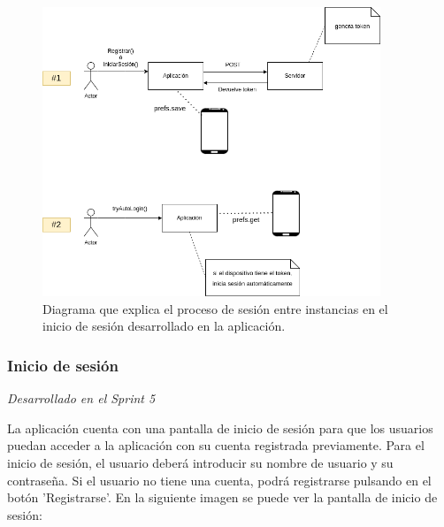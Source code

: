 \begin{itemize}
    \begin{figure}[H]
      \centering
      \includegraphics[width=0.9\textwidth]{imagenes/c7/token2.png}
      \caption{Diagrama que explica el proceso de sesión entre instancias en el inicio de sesión desarrollado en la aplicación.}
      \label{fig:sesion}

    \end{figure}

  \end{itemize}

\subsubsection{Inicio de sesión}
\textit{Desarrollado en el Sprint 5}
\label{sec:login}

La aplicación cuenta con una pantalla de inicio de sesión para que los usuarios puedan acceder a la aplicación con su cuenta registrada previamente. 
Para el inicio de sesión, el usuario deberá introducir su nombre de usuario y su contraseña. 
Si el usuario no tiene una cuenta, podrá registrarse pulsando en el botón 'Registrarse'. En la siguiente imagen se puede ver la pantalla de inicio de sesión:


